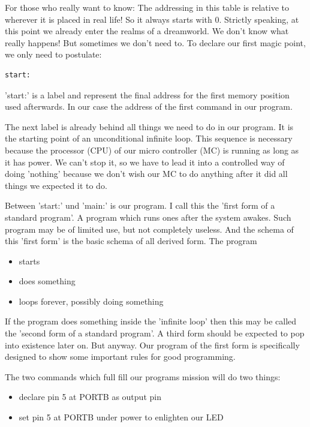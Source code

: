 For those who really want to know: The addressing in this table is relative to wherever it is placed in real life! So it always starts with 0. Strictly speaking, at this point we already enter the realms of a dreamworld. We don't know what really happens! But sometimes we don't need to. To declare our first magic point, we only need to postulate:

\begin{lstlisting}
start:
\end{lstlisting}

'start:'  is a label and represent the final address for the first memory position used afterwards. In our case the address of the first command in our program.

The next label is already behind all things we need to do in our program. It is the starting point of an unconditional infinite loop. This sequence is necessary because the processor (CPU) of our micro controller (MC) is running as long as it has power. We can't stop it, so we have to lead it into a controlled way of doing 'nothing' because we don't wish our MC to do anything after it did all things we expected it to do.

Between 'start:' und 'main:' is our program. I call this the 'first form of a standard program'. A program which runs ones after the system awakes. Such program may be of limited use, but not completely useless. And the schema of this 'first form' is the basic schema of all derived form. The program 

\begin{itemize}
  \item  starts
  \item  does something
  \item  loops forever, possibly doing something
\end{itemize}

If the program does something inside the 'infinite loop' then this may be called the 'second form of a standard program'. A third form should be expected to pop into existence later on. But anyway. Our program of the first form is specifically designed to show some important rules for good programming.

The two commands which full fill our programs mission will do two things:

\begin{itemize}
  \item  declare pin 5 at PORTB as output pin
  \item  set pin 5 at PORTB under power to enlighten our LED
\end{itemize}

